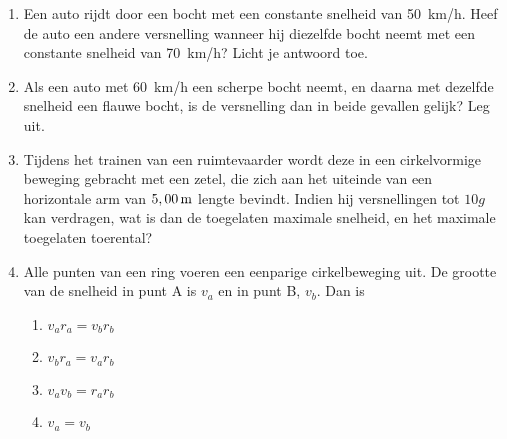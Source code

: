 \begin{enumerate}
\item Een auto rijdt door een bocht met een constante snelheid van \SI{50}{km/h}. Heef de auto een andere versnelling wanneer hij diezelfde bocht neemt met een constante snelheid van \SI{70}{km/h}? Licht je antwoord toe.

\item Als een auto met \SI{60}{km/h} een scherpe bocht neemt, en daarna met dezelfde snelheid een flauwe bocht, is de versnelling dan in beide gevallen gelijk? Leg uit.

\item Tijdens het trainen van een ruimtevaarder wordt deze in een cir\-kel\-vor\-mi\-ge beweging gebracht met een zetel, die zich aan het uiteinde van een ho\-ri\-zon\-tale arm van $5,00\rm\,m$ lengte bevindt. Indien hij versnellingen tot $10g$ kan verdragen, wat is dan de toegelaten maximale snelheid, en het maximale toegelaten toerental?


\item 
\begin{minipage}[t]{0.5\textwidth}
Alle punten van een ring voeren een eenparige cirkelbeweging
uit. De grootte van de snelheid in punt A is $v_a$ en in punt B,
$v_b$. Dan is
\begin{enumerate}
\item $v_ar_a=v_br_b$
\item $v_br_a=v_ar_b$
\item $v_av_b=r_ar_b$
\item $v_a=v_b$
\end{enumerate}
\end{minipage}
\hspace{0.1\textwidth}
\begin{minipage}[t]{0.3\textwidth}
\end{minipage}


\end{enumerate}
